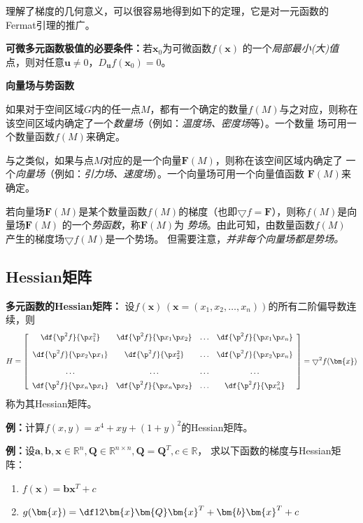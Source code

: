 理解了梯度的几何意义，可以很容易地得到如下的定理，它是对一元函数的Fermat引理的推广。
\begin{thx}
	{\bf 可微多元函数极值的必要条件：}若$\bm{x}_0$为可微函数$f(\bm{x})$
	的一个{\it 局部最小(大)值}点，则对任意$\bm{u}\ne 0$，$D_{\bm{u}}
	f(\bm{x}_0)=0$。
\end{thx}

\begin{shaded}
	{\bf 向量场与势函数}
	
	如果对于空间区域$G$内的任一点$M$，都有一个确定的数量$f(M)$与之对应，则称在
	该空间区域内确定了一个{\it 数量场}（例如：{\it 温度场、密度场}等）。一个数量
	场可用一个数量函数$f(M)$来确定。
	
	与之类似，如果与点$M$对应的是一个向量$\bm{F}(M)$，则称在该空间区域内确定了
	一个{\it 向量场}（例如：{\it 引力场、速度场}）。一个向量场可用一个向量值函数
	$\bm{F}(M)$来确定。
	
	若向量场$\bm{F}(M)$是某个数量函数$f(M)$的梯度（也即$\bigtriangledown
	f=\bm{F}$），则称$f(M)$是向量场$\bm{F}(M)$ 的一个{\it 势函数}，称$\bm{F}(M)$为{\it
	势场}。由此可知，由数量函数$f(M)$ 产生的梯度场$\bigtriangledown f(M)$是一个势场。
	但需要注意，{\it 并非每个向量场都是势场。}
	
\end{shaded}

\subsection{Hessian矩阵}

\begin{thx}
	{\bf 多元函数的Hessian矩阵：}
	设$f(\bm{x})\,(\bm{x}=(x_1,x_2,\ldots,x_n))$的所有二阶偏导数连续，则 
	$$H=\left[\begin{array}{cccc}
		\df{\p^2 f}{\p x_1^2} & \df{\p^2 f}{\p x_1\p x_2} & \ldots & \df{\p^2
		f}{\p x_1\p x_n}\\[10pt]
		\df{\p^2 f}{\p x_2\p x_1} & \df{\p^2 f}{\p x_2^2} & \ldots & \df{\p^2
		f}{\p x_2\p x_n}\\[10pt]
		\ldots & \ldots & \ldots & \ldots\\[6pt]
		\df{\p^2 f}{\p x_n\p x_1} & \df{\p^2 f}{\p x_n\p x_2} & \ldots & \df{\p^2
		f}{\p x_n^2}
		\end{array}\right]
	=\bigtriangledown^2 f(\bm{x})$$
	称为其Hessian矩阵。
\end{thx}

{\bf 例：}计算$f(x,y)=x^4+xy+(1+y)^2$的Hessian矩阵。

{\bf 例：}设$\bm{a},\bm{b},\bm{x}\in\mathbb{R}^n,\bm{Q}
\in\mathbb{R}^{n\times n},\bm{Q}=\bm{Q}^T,c\in\mathbb{R}$，
求以下函数的梯度与Hessian矩阵：
\begin{enumerate}[(1)]
  \setlength{\itemindent}{1cm}
  \item $f(\bm{x})=\bm{b}\bm{x}^{T}+c$
  \item $g(\bm{x})=\df 12\bm{x}\bm{Q}\bm{x}^T+\bm{b}\bm{x}^{T}+c$
\end{enumerate}

